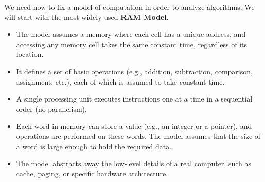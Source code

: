 \newpage

We need now to fix a model of computation in order to analyze algorithms. We will start with the most widely used \textbf{RAM Model}.
\begin{itemize}
    \item The model assumes a memory where each cell has a unique address, and accessing any memory cell takes the same constant time, regardless of its location. 
    \item It defines a set of basic operations (e.g., addition, subtraction, comparison, assignment, etc.), each of which is assumed to take constant time.
    \item A single processing unit executes instructions one at a time in a sequential order (no parallelism).
    \item Each word in memory can store a value (e.g., an integer or a pointer), and operations are performed on these words. The model assumes that the size of a word is large enough to hold the required data.
    \item The model abstracts away the low-level details of a real computer, such as cache, paging, or specific hardware architecture.
\end{itemize}

